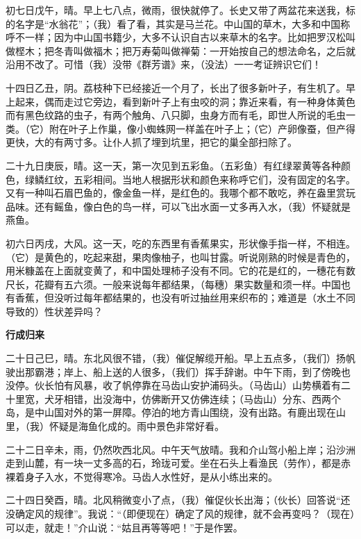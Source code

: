 \documentclass[12pt,UTF-8,openany,a4]{ctexbook}
\begin{document}
\begin{large}
    初七日戊午，晴。早上七八点，微雨，很快就停了。长史又带了两盆花来送我，标的名字是“水翁花”；（我）看了看，其实是马兰花。中山国的草木，大多和中国称呼不一样；因为中山国书籍少，大多不认识自古以来草木的名字。比如把罗汉松叫做㭴木；把冬青叫做福木；把万寿菊叫做禅菊：一开始按自己的想法命名，之后就沿用不改了。可惜（我）没带《群芳谱》来，（没法）一一考证辨识它们！
    
    十四日乙丑，阴。荔枝种下已经接近一个月了，长出了很多新叶子，有生机了。早上起来，偶而走过它旁边，看到新叶子上有虫咬的洞；靠近来看，有一种身体黄色而有黑色纹路的虫子，有两个触角、八只脚，虫身方而有毛，即世人所说的毛虫一类。（它）附在叶子上作巢，像小蜘蛛网一样盖在叶子上；（它）产卵像蚕，但产得更快，大的有两寸多。让仆人抓了埋到坑里，把它的巢全部扫除了。
    
    二十九日庚辰，晴。这一天，第一次见到五彩鱼。（五彩鱼）有红绿翠黄等各种颜色，绿鳞红纹，五彩相间。当地人根据形状和颜色来称呼它们，没有固定的名字。又有一种叫石眉巴鱼的，像金鱼一样，是红色的。我哪个都不敢吃，养在盎里赏玩品味。还有鳐鱼，像白色的鸟一样，可以飞出水面一丈多再入水，（我）怀疑就是燕鱼。
    
    初六日丙戌，大风。这一天，吃的东西里有香蕉果实，形状像手指一样，不相连。（它）是黄色的，吃起来甜，果肉像柚子，也叫甘露。听说刚熟的时候是青色的，用米糠盖在上面就变黄了，和中国处理柿子没有不同。它的花是红的，一穗花有数尺长，花瓣有五六须。一般来说每年都结果，（每穗）果实数量和须一样。中国也有香蕉，但没听过每年都结果的，也没有听过抽丝用来织布的；难道是（水土不同导致的）性状差异吗？
    
    \begin{center}{\Large\textbf{行成归来}}\end{center}
    
    二十日己巳，晴。东北风很不错，（我）催促解缆开船。早上五点多，（我们）扬帆驶出那霸港；岸上、船上送的人很多，（我们）挥手辞谢。中午下雨，到了傍晚也没停。伙长怕有风暴，收了帆停靠在马齿山安护浦码头。（马齿山）山势横着有二十里宽，犬牙相错，出没海中，仿佛断开又仿佛连续；（马齿山）分东、西两个岛，是中山国对外的第一屏障。停泊的地方青山围绕，没有出路。有鹿出现在山里，（我）怀疑是海鱼化成的。雨中景色非常好看。
    
    二十二日辛未，雨，仍然吹西北风。中午天气放晴。我和介山驾小船上岸；沿沙洲走到山麓，有一块一丈多高的石，玲珑可爱。坐在石头上看渔民（劳作），都是赤裸着身子入水，不觉得寒冷。马齿人水性好，是从小练出来的。
    
    二十四日癸酉，晴。北风稍微变小了点，（我）催促伙长出海；（伙长）回答说“还没确定风的规律”。我说：“（即便现在）确定了风的规律，就不会再变吗？（现在）可以走，就走！”介山说：“姑且再等等吧！”于是作罢。
    

\end{large}
\end{document}
